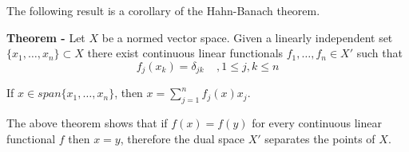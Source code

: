 \documentclass[12pt]{article}
\begin{document}
The following result is a corollary of the Hahn-Banach theorem.

{\bf Theorem -} Let $X$ be a normed vector space. Given a linearly independent set $\{x_1,\dots ,x_n\} \subset X$ there exist continuous linear functionals $f_1, \dots , f_n \in X'$ such that
\begin{displaymath}
f_j(x_k)=\delta_{jk}\;\;\;\; , 1\leq j, k \leq n
\end{displaymath}

If $x \in span\{x_1, \dots , x_n\}$, then $\displaystyle x= \sum_{j=1}^n f_j(x)x_j$.

The above theorem shows that if $f(x)=f(y)$ for every continuous linear functional $f$ then $x=y$, therefore the dual space $X'$ separates the points of $X$.
\end{document}
